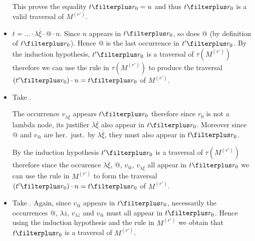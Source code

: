 \begin{itemize}
        This proves the equality $t \filterplus r_0 = u$ and thus $t \filterplus r_0$ is a valid traversal of $M^{(r')}$.

    \item {} $t = \ldots \cdot \lambda \overline{\xi} \cdot @ \cdot n$.
        Since $n$ appears in $t\filterplus r_0$, so does $@$ (by definition of $t\filterplus r_0$). Hence @ is the last occurrence in $t'\filterplus r_0$. By the induction hypothesis, $t' \filterplus r_0$ is a traversal of $\tau(M^{(r')})$ therefore we can use the rule  in $\tau(M^{(r')})$ to produce the traversal $(t'\filterplus r_0) \cdot n = t \filterplus r_0$ of $M^{(r')}$.


    \item {} Take .

        The occurrence $v_{\lambda \overline{\xi}}$ appears
        $t\filterplus r_0$ therefore since $r_0$ is not a lambda
        node, its justifier $\lambda \overline{\xi}$ also appear in
        $t\filterplus r_0$. Moreover since $@$ and $v_@$ are her.\
        just.\ by $\lambda \overline{\xi}$, they must also appear in
        $t\filterplus r_0$.

        By the induction hypothesis $t' \filterplus r_0$ is a
        traversal of $\tau(M^{(r')})$ therefore since the occurence
        $\lambda \overline{\xi}$, @, $v_@$, $v_{\lambda
        \overline{\xi}}$ all appear in $t\filterplus r_0$ we can use
        the rule \rulenamet{Value^{@\mapsto\lambda}} in $M^{(r')}$
        to form the traversal $(t'\filterplus r_0) \cdot n = t
        \filterplus r_0$ of $M^{(r')}$.

    \item {}
          Take . Again, since $v_@$ appears in $t
        \filterplus r_0$, necessarily the occurrences @, $\lambda
        \overline{z}$, $v_{\lambda \overline{z}}$ and $v_@$ must all
        appear in $t \filterplus r_0$. Hence using the induction
        hypothesis and the rule
         in $M^{(r')}$ we
        obtain that $t \filterplus r_0$ is a traversal of
        $M^{(r')}$.


\end{itemize}
